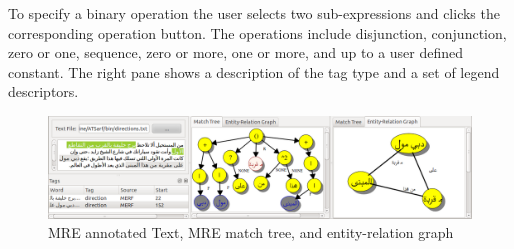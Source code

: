 
To specify a binary operation the user selects two sub-expressions and clicks the corresponding
operation button. 
The operations include disjunction, conjunction, zero or one, sequence, zero or more, 
one or more, and up to a user defined constant.
The right pane shows a description of the tag type and a set of legend 
descriptors. 

%

\begin{figure}[tb!]
  \centering
  \includegraphics[width=\textwidth]{figures/treegraph}
  \caption{MRE annotated Text, MRE match tree, and entity-relation graph}
  \label{fig:treegraph}
\end{figure}


